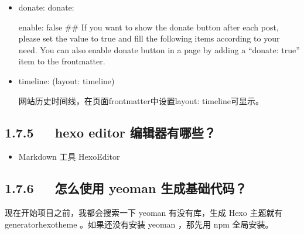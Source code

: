 \documentclass[letterpaper,12pt,english]{sphinxmanual}
\begin{document}
\begin{itemize}
\begin{enumerate}
\item {} 
mathjax2: true

但是，如果你的文章内容中经常出现美元符号“\$”, 或者说你想将“\$”用作美元符号而非行内公     式的定界符，请在Hexo目录的\_config.yml中添加：

而不是mathjax: true。      相应地，在需要使用数学公式的文章的front\sphinxhyphen{}matter中也添加mathjax2: true。

\end{enumerate}

\item {} 
donate: donate:

enable: false \#\# If you want to show the donate button after each post, please set the value to true and fill the following items according to your need. You can also enable donate button in a page by adding a “donate: true” item to the front\sphinxhyphen{}matter.

\item {} 
timeline: (layout: timeline)

网站历史时间线，在页面front\sphinxhyphen{}matter中设置layout: timeline可显示。

\end{itemize}


\subsection{1.7.5   hexo editor 编辑器有哪些？}
\label{\detokenize{001software/001install/001._u7f51_u7ad9/hexo:hexo-editor}}\begin{itemize}
\item {} 
Markdown 工具 HexoEditor



\end{itemize}


\subsection{1.7.6   怎么使用 yeoman 生成基础代码？}
\label{\detokenize{001software/001install/001._u7f51_u7ad9/hexo:yeoman}}
现在开始项目之前，我都会搜索一下 yeoman 有没有库，生成 Hexo 主题就有 generator\sphinxhyphen{}hexo\sphinxhyphen{}theme 。如果还没有安装 yeoman ，那先用 npm 全局安装。
\end{document}
